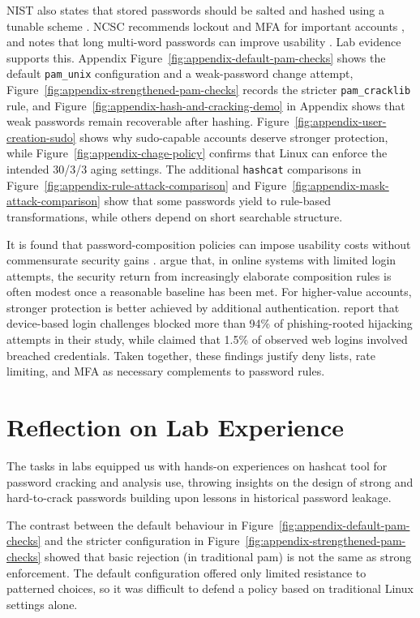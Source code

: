 \documentclass[12pt,a4paper]{article}
\begin{document}
NIST also states that stored passwords should be salted and hashed using a tunable scheme
\citep{nist80063b2025}. NCSC recommends lockout and MFA for important accounts
\citep{ncscPolicy2018}, and notes that long multi-word passwords can improve usability
\citep{ncscThreeWords2021}. Lab evidence supports this. Appendix
Figure~\ref{fig:appendix-default-pam-checks} shows the default \texttt{pam\_unix}
configuration and a weak-password change attempt,
Figure~\ref{fig:appendix-strengthened-pam-checks} records the stricter
\texttt{pam\_cracklib} rule, and Figure~\ref{fig:appendix-hash-and-cracking-demo} in Appendix
shows that weak passwords remain recoverable after hashing. Figure~\ref{fig:appendix-user-creation-sudo} shows why sudo-capable accounts deserve stronger
protection, while Figure~\ref{fig:appendix-chage-policy} confirms that Linux can
enforce the intended 30/3/3 aging settings. The additional \texttt{hashcat} comparisons in Figure~\ref{fig:appendix-rule-attack-comparison} and
Figure~\ref{fig:appendix-mask-attack-comparison} show that some passwords yield to rule-based
transformations, while others depend on short searchable structure.

It is found that password-composition policies can impose usability costs without commensurate security gains \citep{egelman2011passwords}.
\citet{florencio2007strong} argue that, in online systems with limited login attempts, the
security return from increasingly elaborate composition rules is often modest once a reasonable
baseline has been met. For higher-value accounts, stronger protection is better achieved by
additional authentication. \citet{doerfler2019login} report that device-based login challenges
blocked more than 94\% of phishing-rooted hijacking attempts in their study, while
\citet{thomas2019breach} claimed that 1.5\% of observed web logins involved breached
credentials. Taken together, these findings justify deny lists, rate limiting, and MFA as
necessary complements to password rules.

\section{Reflection on Lab Experience}
The tasks in labs equipped us with hands-on experiences on hashcat tool for password cracking and analysis use, throwing insights on the design of strong and hard-to-crack passwords building upon lessons in historical password leakage.

The contrast between the default behaviour in
Figure~\ref{fig:appendix-default-pam-checks} and the stricter configuration in
Figure~\ref{fig:appendix-strengthened-pam-checks} showed that basic rejection (in traditional pam) is not the same
as strong enforcement. The default configuration offered only limited resistance to patterned
choices, so it was difficult to defend a policy based on traditional Linux settings alone.
\end{document}
